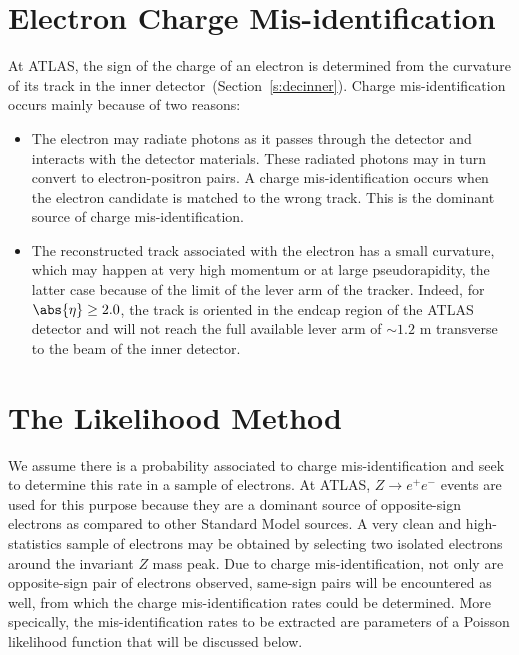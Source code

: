 \section{Electron Charge Mis-identification}\label{s:chargereasons}

At ATLAS, the sign of the charge of an electron is determined from the
curvature of its track in the inner detector~(Section~\ref{s:decinner}). Charge
mis-identification occurs mainly because of two reasons:

\begin{itemize}

	\item The electron may radiate photons as it passes through the detector and
	      interacts with the detector materials. These radiated photons may in turn
	      convert to electron-positron pairs. A charge mis-identification occurs when the
	      electron candidate is matched to the wrong track. This is
	      the dominant source of charge mis-identification.

	\item The reconstructed track associated with the electron has a small
	      curvature, which may happen at very high momentum or at large pseudorapidity,
	      the latter case because of the limit of the lever arm of the tracker. Indeed,
	      for $\abs{\eta}\geq 2.0$, the track is oriented in the endcap region of the
	      ATLAS detector and will not reach the full available lever arm of $\sim 1.2$
	      m transverse to the beam of the inner detector.

\end{itemize}

\section{The Likelihood Method}\label{s:cllhmethod}

We assume there is a probability associated to charge mis-identification and
seek to determine this rate in a sample of electrons. At ATLAS, $Z\to e^+e^-$
events are used for this purpose because they are a dominant source of
opposite-sign electrons as compared to other Standard Model sources. A very
clean and high-statistics sample of electrons may be obtained by selecting two
isolated electrons around the invariant $Z$ mass peak. Due to charge
mis-identification, not only are opposite-sign pair of electrons observed,
same-sign pairs will be encountered as well, from which the charge
mis-identification rates could be determined. More specically, the
mis-identification rates to be extracted are parameters of a Poisson likelihood
function that will be discussed below.

